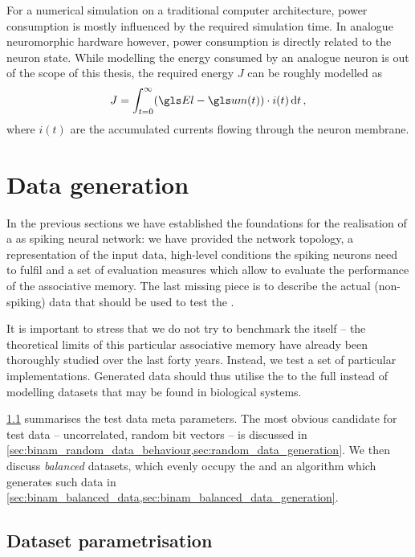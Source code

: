 For a numerical simulation on a traditional computer architecture, power consumption is mostly influenced by the required simulation time. In analogue neuromorphic hardware however, power consumption is directly related to the neuron state. While modelling the energy consumed by an analogue neuron is out of the scope of this thesis, the required energy $J$ can be roughly modelled as
\begin{align}
	J = \int_{t = 0}^{\infty} (\El - \um(t)) \cdot i(t) \, \mathrm{d}t \,,
	\label{eqn:energy}
\end{align}
where $i(t)$ are the accumulated currents flowing through the neuron membrane.


\section{Data generation}
\label{sec:data_generation}

In the previous sections we have established the foundations for the realisation of a \BiNAM as spiking neural network: we have provided the network topology, a representation of the input data, high-level conditions the spiking neurons need to fulfil and a set of evaluation measures which allow to evaluate the performance of the associative memory. The last missing piece is to describe the actual (non-spiking) data that should be used to test the \BiNAM.

It is important to stress that we do not try to benchmark the \BiNAM itself -- the theoretical limits of this particular associative memory have already been thoroughly studied over the last forty years. Instead, we test a set of particular \BiNAM implementations. Generated data should thus utilise the \BiNAM to the full instead of modelling datasets that may be found in biological systems.

\cref{sec:data_parametrisation} summarises the test data meta parameters. The most obvious candidate for test data -- uncorrelated, random bit vectors -- is discussed in  \cref{sec:binam_random_data_behaviour,sec:random_data_generation}. We then discuss \emph{balanced} datasets, which evenly occupy the \BiNAM and an algorithm which generates such data in \cref{sec:binam_balanced_data,sec:binam_balanced_data_generation}.

\subsection{Dataset parametrisation}
\label{sec:data_parametrisation}

